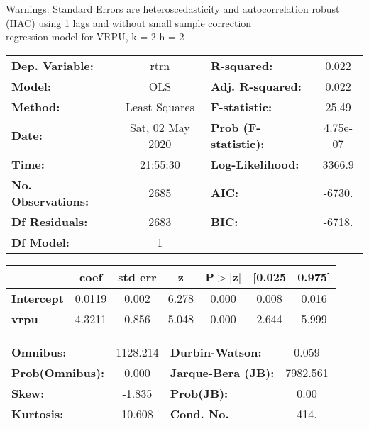 Warnings: \newline
 [1] Standard Errors are heteroscedasticity and autocorrelation robust (HAC) using 1 lags and without small sample correction\\ 

regression model for VRPU, k = 2 h = 2\begin{center}
\begin{tabular}{lclc}
\toprule
\textbf{Dep. Variable:}    &       rtrn       & \textbf{  R-squared:         } &     0.022   \\
\textbf{Model:}            &       OLS        & \textbf{  Adj. R-squared:    } &     0.022   \\
\textbf{Method:}           &  Least Squares   & \textbf{  F-statistic:       } &     25.49   \\
\textbf{Date:}             & Sat, 02 May 2020 & \textbf{  Prob (F-statistic):} &  4.75e-07   \\
\textbf{Time:}             &     21:55:30     & \textbf{  Log-Likelihood:    } &    3366.9   \\
\textbf{No. Observations:} &        2685      & \textbf{  AIC:               } &    -6730.   \\
\textbf{Df Residuals:}     &        2683      & \textbf{  BIC:               } &    -6718.   \\
\textbf{Df Model:}         &           1      & \textbf{                     } &             \\
\bottomrule
\end{tabular}
\begin{tabular}{lcccccc}
                   & \textbf{coef} & \textbf{std err} & \textbf{z} & \textbf{P$> |$z$|$} & \textbf{[0.025} & \textbf{0.975]}  \\
\midrule
\textbf{Intercept} &       0.0119  &        0.002     &     6.278  &         0.000        &        0.008    &        0.016     \\
\textbf{vrpu}      &       4.3211  &        0.856     &     5.048  &         0.000        &        2.644    &        5.999     \\
\bottomrule
\end{tabular}
\begin{tabular}{lclc}
\textbf{Omnibus:}       & 1128.214 & \textbf{  Durbin-Watson:     } &    0.059  \\
\textbf{Prob(Omnibus):} &   0.000  & \textbf{  Jarque-Bera (JB):  } & 7982.561  \\
\textbf{Skew:}          &  -1.835  & \textbf{  Prob(JB):          } &     0.00  \\
\textbf{Kurtosis:}      &  10.608  & \textbf{  Cond. No.          } &     414.  \\
\bottomrule
\end{tabular}
\end{center}


